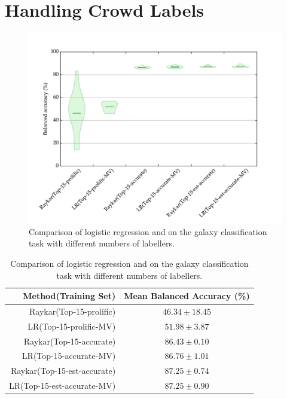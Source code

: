 \section{Handling Crowd Labels}
\label{sec:rgz-crowd-labels}

  \begin{figure}
    \centering
    \includegraphics[width=\textwidth]{images/experiments/rgz_raykar}
    \caption{Comparison of logistic regression and \citeauthor{raykar10} on the
      galaxy classification task with different numbers of labellers.}
    \label{fig:rgz-raykar}
  \end{figure}

  \begin{table}
    \centering
    \begin{tabular}{r|c}
      \textbf{Method(Training Set)} & \textbf{Mean Balanced Accuracy (\%)}\\\hline
      Raykar(Top-15-prolific) & $46.34 \pm 18.45$\\
      LR(Top-15-prolific-MV) & $51.98 \pm 3.87$\\
      Raykar(Top-15-accurate) & $86.43 \pm 0.10$\\
      LR(Top-15-accurate-MV) & $86.76 \pm 1.01$\\
      Raykar(Top-15-est-accurate) & $87.25 \pm 0.74$\\
      LR(Top-15-est-accurate-MV) & $87.25 \pm 0.90$\\
    \end{tabular}
    \caption{Comparison of logistic regression and \citeauthor{raykar10} on the
      galaxy classification task with different numbers of labellers.}
    \label{tab:rgz-raykar}
  \end{table}

